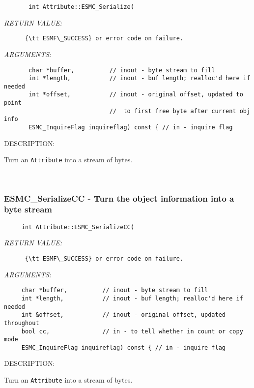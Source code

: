   
\begin{verbatim}       int Attribute::ESMC_Serialize(\end{verbatim}{\em RETURN VALUE:}
\begin{verbatim}      {\tt ESMF\_SUCCESS} or error code on failure.\end{verbatim}{\em ARGUMENTS:}
\begin{verbatim}       char *buffer,          // inout - byte stream to fill
       int *length,           // inout - buf length; realloc'd here if needed
       int *offset,           // inout - original offset, updated to point 
                              //  to first free byte after current obj info
       ESMC_InquireFlag inquireflag) const { // in - inquire flag
   \end{verbatim}
{\sf DESCRIPTION:\\ }


      Turn an {\tt Attribute} into a stream of bytes.
   
 
\mbox{}\hrulefill\
 
\subsubsection [ESMC\_SerializeCC] {ESMC\_SerializeCC - Turn the object information into a byte stream}


  
\begin{verbatim}     int Attribute::ESMC_SerializeCC(\end{verbatim}{\em RETURN VALUE:}
\begin{verbatim}      {\tt ESMF\_SUCCESS} or error code on failure.\end{verbatim}{\em ARGUMENTS:}
\begin{verbatim}     char *buffer,          // inout - byte stream to fill
     int *length,           // inout - buf length; realloc'd here if needed
     int &offset,           // inout - original offset, updated throughout
     bool cc,               // in - to tell whether in count or copy mode
     ESMC_InquireFlag inquireflag) const { // in - inquire flag\end{verbatim}
{\sf DESCRIPTION:\\ }


      Turn an {\tt Attribute} into a stream of bytes.
  
\setlength{\parskip}{\oldparskip}
\setlength{\parindent}{\oldparindent}
\setlength{\baselineskip}{\oldbaselineskip}
